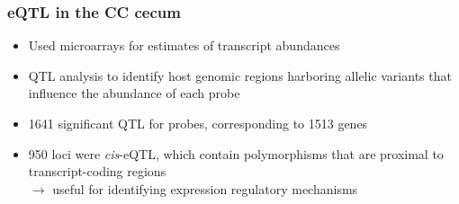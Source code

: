 \documentclass{beamer}
\begin{document}
		\begin{frame}
			\frametitle{eQTL in the CC cecum}
			\begin{itemize}
				\item Used microarrays for estimates of transcript abundances
				\item QTL analysis to identify host genomic regions harboring allelic variants that influence the abundance of each probe
				\item 1641 significant QTL for probes, corresponding to 1513 genes
				\item 950 loci were \emph{cis}-eQTL, which contain polymorphisms that are proximal to transcript-coding regions \\ $\rightarrow$ useful for identifying expression regulatory mechanisms 
			\end{itemize}
		\end{frame}
\end{document}

